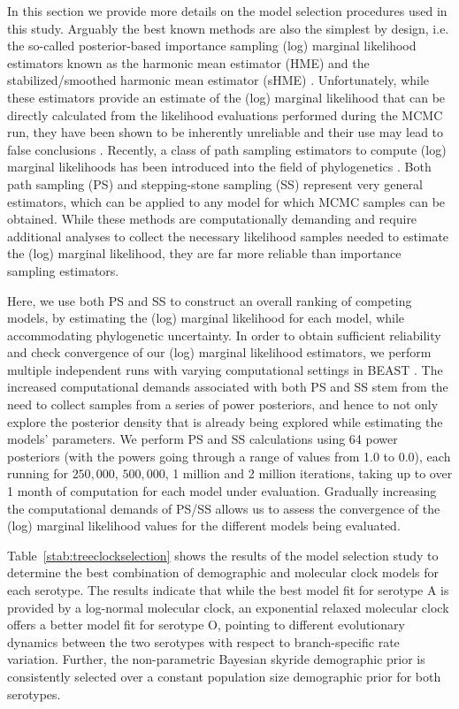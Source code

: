\documentclass[a4paper,10pt]{article}
\begin{document}
In this section we provide more details on the model selection procedures used in this study.
Arguably the best known methods are also the simplest by design, i.e. the so-called posterior-based importance sampling (log) marginal likelihood estimators known as the harmonic mean estimator (HME) \cite{Newton} and the stabilized/smoothed harmonic mean estimator (sHME) \cite{M-suchard2005models}.
Unfortunately, while these estimators provide an estimate of the (log) marginal likelihood that can be directly calculated from the likelihood evaluations performed during the MCMC run, they have been shown to be inherently unreliable and their use may lead to false conclusions \cite{M-LartillotPhilippe, M-Xie, M-Baele2012, M-Baele2013a, M-Baele2013b, M-Baele2013c}.
Recently, a class of path sampling estimators to compute (log) marginal likelihoods has been introduced into the field of phylogenetics \cite{M-LartillotPhilippe, M-Xie}.
Both path sampling (PS) and stepping-stone sampling (SS) represent very general estimators, which can be applied to any model for which MCMC samples can be obtained.
While these methods are computationally demanding and require additional analyses to collect the necessary likelihood samples needed to estimate the (log) marginal likelihood, they are far more reliable than importance sampling estimators.

Here, we use both PS and SS to construct an overall ranking of competing models, by estimating the (log) marginal likelihood for each model, while accommodating phylogenetic uncertainty.
In order to obtain sufficient reliability and check convergence of our (log) marginal likelihood estimators, we perform multiple independent runs with varying computational settings in BEAST \cite{M-beast2012}.
The increased computational demands associated with both PS and SS stem from the need to collect samples from a series of power posteriors, and hence to not only explore the posterior density that is already being explored while estimating the models' parameters.
We perform PS and SS calculations using 64 power posteriors (with the powers going through a range of values from 1.0 to 0.0), each running for $250,000$, $500,000$, 1 million and 2 million iterations, taking up to over 1 month of computation for each model under evaluation.
Gradually increasing the computational demands of PS/SS allows us to assess the convergence of the (log) marginal likelihood values for the different models being evaluated.

Table~\ref{stab:treeclockselection} shows the results of the model selection study to determine the best combination of demographic and molecular clock models for each serotype.
The results indicate that while the best model fit for serotype A is provided by a log-normal molecular clock, an exponential relaxed molecular clock offers a better model fit for serotype O, pointing to different evolutionary dynamics between the two serotypes with respect to branch-specific rate variation. 
Further, the non-parametric Bayesian skyride demographic prior is consistently selected over a constant population size demographic prior for both serotypes. 
\end{document}

